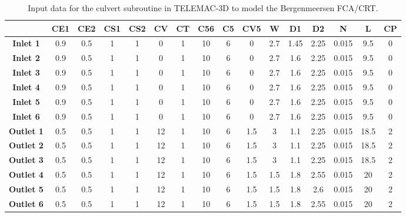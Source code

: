 \begin{table}[H]
\caption{Input data for the culvert subroutine in TELEMAC-3D to model the Bergenmeersen FCA/CRT.}\label{tab:bergenmeersen_table2}
\small
\begin{center}\begin{tabular}{|c|c|c|c|c|c|c|c|c|c|c|c|c|c|c|c|}
\hline
~ & \textbf{CE1} & \textbf{CE2} & \textbf{CS1} & \textbf{CS2} & \textbf{CV} & \textbf{CT} & \textbf{C56} & \textbf{C5} & \textbf{CV5} & \textbf{W} & \textbf{D1} & \textbf{D2} & \textbf{N} & \textbf{L} & \textbf{CP}\\
\hline
\textbf{Inlet 1} & 0.9 & 0.5 & 1 & 1 & 0 & 1 & 10 & 6 & 0 & 2.7 & 1.45 & 2.25 & 0.015 & 9.5 & 0 \\
\hline
\textbf{Inlet 2} & 0.9 & 0.5 & 1 & 1 & 0 & 1 & 10 & 6 & 0 & 2.7 & 1.6 & 2.25 & 0.015 & 9.5 & 0 \\
\hline
\textbf{Inlet 3} & 0.9 & 0.5 & 1 & 1 & 0 & 1 & 10 & 6 & 0 & 2.7 & 1.6 & 2.25 & 0.015 & 9.5 & 0 \\
\hline
\textbf{Inlet 4} & 0.9 & 0.5 & 1 & 1 & 0 & 1 & 10 & 6 & 0 & 2.7 & 1.6 & 2.25 & 0.015 & 9.5 & 0 \\
\hline
\textbf{Inlet 5} & 0.9 & 0.5 & 1 & 1 & 0 & 1 & 10 & 6 & 0 & 2.7 & 1.6 & 2.25 & 0.015 & 9.5 & 0 \\
\hline
\textbf{Inlet 6} & 0.9 & 0.5 & 1 & 1 & 0 & 1 & 10 & 6 & 0 & 2.7 & 1.6 & 2.25 & 0.015 & 9.5 & 0 \\
\hline
\textbf{Outlet 1} & 0.5 & 0.5 & 1 & 1 & 12 & 1 & 10 & 6 & 1.5 & 3 & 1.1 & 2.25 & 0.015 & 18.5 & 2 \\
\hline
\textbf{Outlet 2} & 0.5 & 0.5 & 1 & 1 & 12 & 1 & 10 & 6 & 1.5 & 3 & 1.1 & 2.25 & 0.015 & 18.5 & 2 \\
\hline
\textbf{Outlet 3} & 0.5 & 0.5 & 1 & 1 & 12 & 1 & 10 & 6 & 1.5 & 3 & 1.1 & 2.25 & 0.015 & 18.5 & 2 \\
\hline
\textbf{Outlet 4} & 0.5 & 0.5 & 1 & 1 & 12 & 1 & 10 & 6 & 1.5 & 1.5 & 1.8 & 2.55 & 0.015 & 20 & 2 \\
\hline
\textbf{Outlet 5} & 0.5 & 0.5 & 1 & 1 & 12 & 1 & 10 & 6 & 1.5 & 1.5 & 1.8 & 2.6 & 0.015 & 20 & 2 \\
\hline
\textbf{Outlet 6} & 0.5 & 0.5 & 1 & 1 & 12 & 1 & 10 & 6 & 1.5 & 1.5 & 1.8 & 2.55 & 0.015 & 20 & 2 \\
\hline
\end{tabular}\end{center}\normalsize
\end{table}
%
